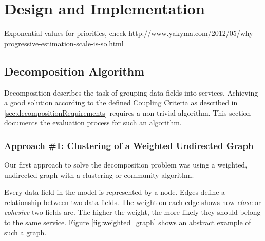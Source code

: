 
\chapter{Design and Implementation}
\label{cha:implementation}

Exponential values for priorities, check http://www.yakyma.com/2012/05/why-progressive-estimation-scale-is-so.html


\section{Decomposition Algorithm}

Decomposition describes the task of grouping data fields into services. Achieving a good solution according to the defined Coupling Criteria as described in \ref{sec:decompositionRequirements} requires a non trivial algorithm. This section documents the evaluation process for such an algorithm.

\subsection{Approach \#1: Clustering of a Weighted Undirected Graph}
\label{subsec:approach1_graph}

Our first approach to solve the decomposition problem was using a weighted, undirected graph with a clustering or community algorithm. 

Every data field in the model is represented by a node. Edges define a relationship between two data fields. The weight on each edge shows how \textit{close} or \textit{cohesive} two fields are. The higher the weight, the more likely they should belong to the same service. Figure \ref{fig:weighted_graph} shows an abstract example of such a graph.


